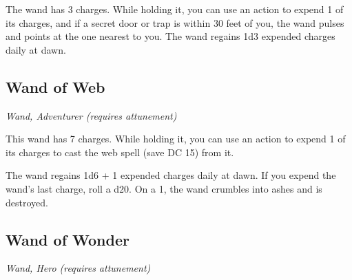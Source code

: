 The wand has 3 charges. While holding it, you can use an action to expend 1 of its charges, and if a secret door or trap is within 30 feet of you, the wand pulses and points at the one nearest to you. The wand regains 1d3 expended charges daily at dawn.

\subsection{Wand of Web}
\textit{Wand, Adventurer (requires attunement)}

This wand has 7 charges. While holding it, you can use an action to expend 1 of its charges to cast the web spell (save DC 15) from it.

The wand regains 1d6 + 1 expended charges daily at dawn. If you expend the wand's last charge, roll a d20. On a 1, the wand crumbles into ashes and is destroyed.

\subsection{Wand of Wonder}
\textit{Wand, Hero (requires attunement)}

